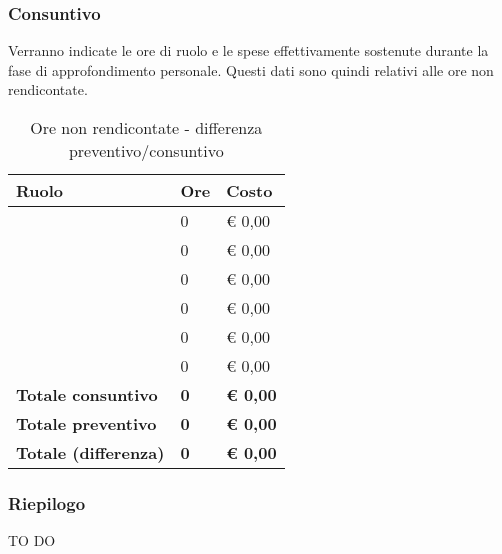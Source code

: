 		\subsubsection{Consuntivo} %
		\label{ssub:consuntivo}
		Verranno indicate le ore di ruolo e le spese effettivamente sostenute durante la fase di approfondimento personale. Questi dati sono quindi relativi alle ore non rendicontate.
		\begin{table}[!h]
			\begin{center}
				\begin{tabularx}{0.65\textwidth}{|l|l|X|}
					\hline
					\textbf{Ruolo} & \textbf{Ore} & \textbf{Costo} \\
					\hline
					\roleProjectManager & 0 & \euro{} 0,00 \\
					\hline
					\roleAnalyst & 0 & \euro{} 0,00 \\
					\hline
					\roleDesigner & 0 & \euro{} 0,00 \\
					\hline
					\roleAdministrator & 0 & \euro{} 0,00 \\
					\hline
					\roleProgrammer & 0 & \euro{} 0,00 \\
					\hline
					\roleVerifier & 0 & \euro{} 0,00 \\
					\hline
					\textbf{Totale consuntivo} & \textbf{0} & \textbf{\euro{} 0,00} \\
					\hline
					\textbf{Totale preventivo} & \textbf{0} & \textbf{\euro{} 0,00} \\
					\hline
					\textbf{Totale (differenza)} & \textbf{0} & \textbf{\euro{} 0,00} \\
					\hline
				\end{tabularx}
			\end{center}
		\caption{Ore non rendicontate - differenza preventivo/consuntivo}
		\end{table}
	
		\subsubsection{Riepilogo} %
		\label{ssub:riepilogo}
		TO DO
		

